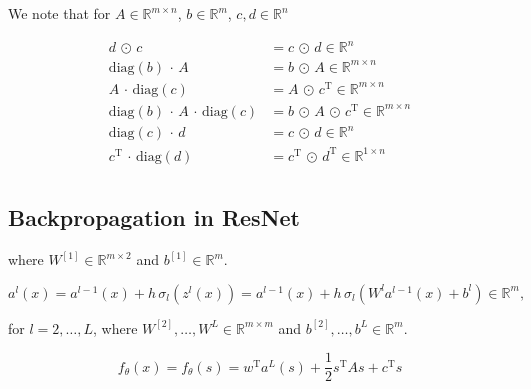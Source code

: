   






We note that for $A \in \mathbb{R}^{m \times n}$, $b \in \mathbb{R}^{m}$, $c, d \in \mathbb{R}^{n}$

\begin{align*}
    d \, \odot \, c &= c \, \odot \, d \in \mathbb{R}^{n} \\
    \mathrm{diag}\left(b\right) \, \cdot \, A &= b \, \odot \, A \in \mathbb{R}^{m \times n} \\
    A \, \cdot \, \mathrm{diag}\left(c\right) &= A \, \odot \, c^{\mathrm{T}} \in \mathbb{R}^{m \times n} \\
    \mathrm{diag}\left(b\right) \, \cdot \, A \, \cdot \, \mathrm{diag}\left(c\right) &= b \, \odot \, A \, \odot \, c^{\mathrm{T}} \in \mathbb{R}^{m \times n} \\
    \mathrm{diag}\left(c\right) \, \cdot \, d &= c \, \odot \, d \in \mathbb{R}^{n} \\
    c^{\mathrm{T}} \, \cdot \, \mathrm{diag}\left(d\right) &= c^{\mathrm{T}} \, \odot \, d^{\mathrm{T}} \in \mathbb{R}^{1 \times n} \\
\end{align*}







\subsection{Backpropagation in ResNet}



where $W^{[1]} \in \mathbb{R}^{m \times 2}$ and $b^{[1]} \in \mathbb{R}^{m}$.

\begin{equation*}
    a^{l}\left(x\right) = a^{l-1}\left(x\right) + h \, \sigma_{l} \left(z^{l}\left(x\right)\right) = a^{l-1}\left(x\right) + h \, \sigma_{l} \left(W^{l} a^{l-1}\left(x\right) + b^{l}\right) \in \mathbb{R}^{m}, 
\end{equation*}

for $l = 2, \ldots, L$, where $W^{[2]}, \ldots, W^{L} \in \mathbb{R}^{m \times m}$ and $b^{[2]}, \ldots, b^{L} \in \mathbb{R}^{m}$.

\begin{equation*}
    f_{\theta}\left(x\right) = f_{\theta}\left(s\right) = w^{\mathrm{T}} a^{L}\left(s\right) + \frac{1}{2} s^{\mathrm{T}} A s + c^{\mathrm{T}} s 
\end{equation*}

